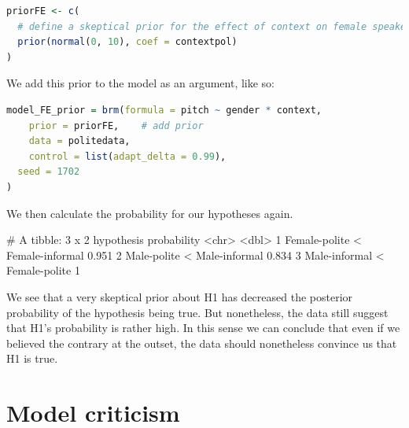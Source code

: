 \documentclass[nobib]{tufte-handout}
\begin{document}
\bigskip

\begin{minipage}[]{1\textwidth}
\begin{lstlisting}[language=R]
priorFE <- c(
  # define a skeptical prior for the effect of context on female speakers
  prior(normal(0, 10), coef = contextpol)
)
\end{lstlisting}
\end{minipage}

We add this prior to the model as an argument, like so:

\bigskip

\begin{minipage}[]{1\textwidth}
\begin{lstlisting}[language=R]
model_FE_prior = brm(formula = pitch ~ gender * context,
	prior = priorFE, 	# add prior 
	data = politedata,
	control = list(adapt_delta = 0.99),
  seed = 1702
)    
\end{lstlisting}
\end{minipage}

We then calculate the probability for our hypotheses again. 

\medskip

\begin{minipage}[]{\textwidth}
\begin{rc}
# A tibble: 3 x 2
  hypothesis                      probability
  <chr>                                 <dbl>
1 Female-polite < Female-informal       0.951
2 Male-polite < Male-informal           0.834
3 Male-informal < Female-polite         1   
\end{rc}
\end{minipage}

\noindent We see that a very skeptical prior about H1 has decreased the posterior probability
of the hypothesis being true. But nonetheless, the data still suggest that H1's probability is
rather high. In this sense we can conclude that even if we believed the contrary at the outset,
the data should nonetheless convince us that H1 is true.

\section{Model criticism}
\end{document}
